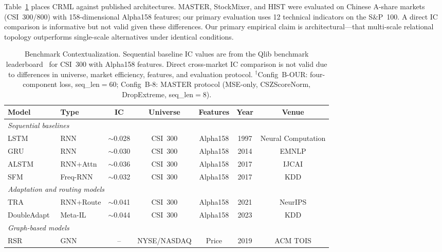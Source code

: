 \documentclass[journal]{IEEEtran}
\begin{document}
Table~\ref{tab:benchmarks} places CRML against published architectures.
MASTER, StockMixer, and HIST were evaluated on Chinese A-share markets
(CSI~300/800) with 158-dimensional Alpha158 features; our primary
evaluation uses 12 technical indicators on the S\&P~100. A direct IC
comparison is informative but not valid given these differences. Our
primary empirical claim is architectural---that multi-scale relational
topology outperforms single-scale alternatives under identical
conditions.

\begin{table}[!t]
\renewcommand{\arraystretch}{1.25}
\caption{Benchmark Contextualization. Sequential baseline IC values are
         from the Qlib benchmark leaderboard~\cite{yang2020qlib} for
         CSI~300 with Alpha158 features. Direct cross-market IC
         comparison is not valid due to differences in universe, market
         efficiency, features, and evaluation protocol.
         $^\dagger$Config~B-OUR: four-component loss, seq\_len$=60$;
         Config~B-8: MASTER protocol (MSE-only, CSZScoreNorm,
         DropExtreme, seq\_len$=8$).}
\label{tab:benchmarks}
\centering
\begin{tabular}{llccccc}
\toprule
\textbf{Model} & \textbf{Type} & \textbf{IC}
               & \textbf{Universe} & \textbf{Features}
               & \textbf{Year} & \textbf{Venue}\\
\midrule
\multicolumn{7}{l}{\textit{Sequential baselines}}\\
LSTM~\cite{hochreiter1997long}    & RNN       & $\sim$0.028 & CSI~300 & Alpha158 & 1997 & Neural Computation\\
GRU~\cite{cho2014learning}        & RNN       & $\sim$0.030 & CSI~300 & Alpha158 & 2014 & EMNLP\\
ALSTM~\cite{qin2017dual}          & RNN+Attn  & $\sim$0.036 & CSI~300 & Alpha158 & 2017 & IJCAI\\
SFM~\cite{zhang2017stock}         & Freq-RNN  & $\sim$0.032 & CSI~300 & Alpha158 & 2017 & KDD\\
\midrule
\multicolumn{7}{l}{\textit{Adaptation and routing models}}\\
TRA~\cite{lin2021learning}        & RNN+Route & $\sim$0.041 & CSI~300 & Alpha158 & 2021 & NeurIPS\\
DoubleAdapt~\cite{zhao2023doubleadapt} & Meta-IL & $\sim$0.044 & CSI~300 & Alpha158 & 2023 & KDD\\
\midrule
\multicolumn{7}{l}{\textit{Graph-based models}}\\
RSR~\cite{feng2019temporal}       & GNN       & --    & NYSE/NASDAQ  & Price      & 2019 & ACM TOIS\\

\end{tabular}
\end{table}
\end{document}
